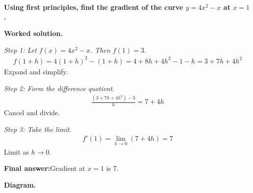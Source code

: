 \documentclass[11pt]{article}
\newcommand{\question}[1]{\par\medskip\noindent\textbf{#1}\par}
\begin{document}
\question{Using first principles, find the gradient of the curve \( y = 4x^2 - x \) at \( x = 1 \).}

\textbf{Worked solution.}

\textit{Step 1: Let \( f(x) = 4x^2 - x \). Then \( f(1) = 3 \).}
\[\begin{gathered}
f(1+h) = 4(1+h)^2 - (1+h) = 4 + 8h + 4h^2 - 1 - h = 3 + 7h + 4h^2
\end{gathered}\]
Expand and simplify.

\textit{Step 2: Form the difference quotient.}
\[\begin{gathered}
\frac{(3 + 7h + 4h^2) - 3}{h} = 7 + 4h
\end{gathered}\]
Cancel and divide.

\textit{Step 3: Take the limit.}
\[\begin{gathered}
f'(1) = \lim_{h \to 0}(7 + 4h) = 7
\end{gathered}\]
Limit as \( h \to 0 \).

\begin{answerbox}
\textbf{Final answer:}\quad Gradient at \(\displaystyle  x = 1 \) is 7.
\end{answerbox}
\textbf{Diagram.}
\end{document}
